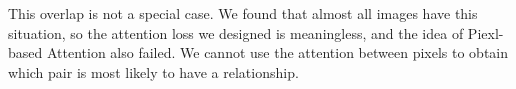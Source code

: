 This overlap is not a special case. We found that almost all images have this situation, so the attention loss we designed is meaningless, and the idea of Piexl-based Attention also failed. We cannot use the attention between pixels to obtain which pair is most likely to have a relationship.

\begin{figure}[h!]
	\centering
\end{figure}
